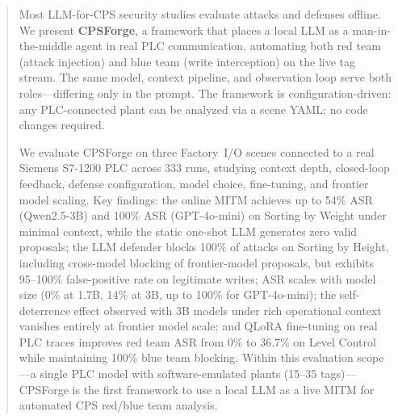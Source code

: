 \begin{abstract}
Most LLM-for-CPS security studies evaluate attacks and defenses offline. We present \textbf{CPSForge}, a framework that places a local LLM as a man-in-the-middle agent in real PLC communication, automating both red team (attack injection) and blue team (write interception) on the live tag stream. The same model, context pipeline, and observation loop serve both roles---differing only in the prompt. The framework is configuration-driven: any PLC-connected plant can be analyzed via a scene YAML; no code changes required.

We evaluate CPSForge on three Factory~I/O scenes connected to a real Siemens S7-1200 PLC across 333 runs, studying context depth, closed-loop feedback, defense configuration, model choice, fine-tuning, and frontier model scaling. Key findings: the online MITM achieves up to 54\% ASR (Qwen2.5-3B) and 100\% ASR (GPT-4o-mini) on Sorting by Weight under minimal context, while the static one-shot LLM generates zero valid proposals; the LLM defender blocks 100\% of attacks on Sorting by Height, including cross-model blocking of frontier-model proposals, but exhibits 95--100\% false-positive rate on legitimate writes; ASR scales with model size (0\% at 1.7B, 14\% at 3B, up to 100\% for GPT-4o-mini); the self-deterrence effect observed with 3B models under rich operational context vanishes entirely at frontier model scale; and QLoRA fine-tuning on real PLC traces improves red team ASR from 0\% to 36.7\% on Level Control while maintaining 100\% blue team blocking. Within this evaluation scope---a single PLC model with software-emulated plants (15--35 tags)---CPSForge is the first framework to use a local LLM as a live MITM for automated CPS red/blue team analysis.
\end{abstract}
